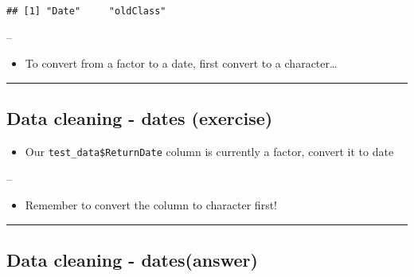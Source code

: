 \documentclass[]{article}
\newenvironment{Shaded}{\begin{snugshade}}{\end{snugshade}}
\newcommand{\DataTypeTok}[1]{\textcolor[rgb]{0.13,0.29,0.53}{#1}}
\newcommand{\KeywordTok}[1]{\textcolor[rgb]{0.13,0.29,0.53}{\textbf{#1}}}
\newcommand{\NormalTok}[1]{#1}
\newcommand{\StringTok}[1]{\textcolor[rgb]{0.31,0.60,0.02}{#1}}
\providecommand{\tightlist}{%
  \setlength{\itemsep}{0pt}\setlength{\parskip}{0pt}}
\begin{document}
\begin{Shaded}
\end{Shaded}

\begin{verbatim}
## [1] "Date"     "oldClass"
\end{verbatim}

--

\begin{itemize}
\tightlist
\item
  To convert from a factor to a date, first convert to a
  character\ldots{}
\end{itemize}

\begin{center}\rule{0.5\linewidth}{\linethickness}\end{center}

\hypertarget{data-cleaning---dates-exercise}{%
\subsection{Data cleaning - dates
(exercise)}\label{data-cleaning---dates-exercise}}

\begin{itemize}
\tightlist
\item
  Our \texttt{test\_data\$ReturnDate} column is currently a factor,
  convert it to date
\end{itemize}

--

\begin{itemize}
\tightlist
\item
  Remember to convert the column to character first!
\end{itemize}

\begin{center}\rule{0.5\linewidth}{\linethickness}\end{center}

\hypertarget{data-cleaning---datesanswer}{%
\subsection{Data cleaning -
dates(answer)}\label{data-cleaning---datesanswer}}
\end{document}
